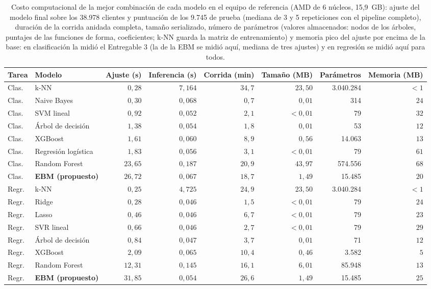 \begin{table}[tbp]
  \centering\scriptsize\setlength{\tabcolsep}{3pt}
  \caption{Costo computacional de la mejor combinación de cada modelo en el equipo de referencia (AMD de 6 núcleos, 15,9~GB): ajuste del modelo final sobre los 38.978 clientes y puntuación de los 9.745 de prueba (mediana de 3 y 5 repeticiones con el pipeline completo), duración de la corrida anidada completa, tamaño serializado, número de parámetros (valores almacenados: nodos de los árboles, puntajes de las funciones de forma, coeficientes; k-NN guarda la matriz de entrenamiento) y memoria pico del ajuste por encima de la base: en clasificación la midió el Entregable 3 (la de la EBM se midió aquí, mediana de tres ajustes) y en regresión se midió aquí para todos.}
  \label{tab:costo}
  \begin{tabular}{@{}l l r r r r r r@{}}
    \toprule
    Tarea & Modelo & Ajuste (s) & Inferencia (s) & Corrida (min) & Tamaño (MB) & Parámetros & Memoria (MB) \\
    \midrule
    Clas. & k-NN & $0{,}28$ & $7{,}164$ & $34{,}7$ & $23{,}50$ & 3.040.284 & $<1$ \\
    Clas. & Naive Bayes & $0{,}30$ & $0{,}068$ & $0{,}7$ & $0{,}01$ & 314 & $24$ \\
    Clas. & SVM lineal & $0{,}92$ & $0{,}052$ & $2{,}1$ & $<0{,}01$ & 79 & $32$ \\
    Clas. & Árbol de decisión & $1{,}38$ & $0{,}054$ & $1{,}8$ & $0{,}01$ & 53 & $12$ \\
    Clas. & XGBoost & $1{,}61$ & $0{,}060$ & $8{,}9$ & $0{,}56$ & 14.063 & $13$ \\
    Clas. & Regresión logística & $1{,}83$ & $0{,}056$ & $3{,}1$ & $<0{,}01$ & 79 & $61$ \\
    Clas. & Random Forest & $23{,}65$ & $0{,}187$ & $20{,}9$ & $43{,}97$ & 574.556 & $68$ \\
    Clas. & \textbf{EBM (propuesto)} & $26{,}72$ & $0{,}067$ & $18{,}7$ & $1{,}49$ & 15.485 & $20$ \\
    \midrule
    Regr. & k-NN & $0{,}25$ & $4{,}725$ & $24{,}9$ & $23{,}50$ & 3.040.284 & $<1$ \\
    Regr. & Ridge & $0{,}28$ & $0{,}046$ & $1{,}5$ & $<0{,}01$ & 79 & $24$ \\
    Regr. & Lasso & $0{,}46$ & $0{,}046$ & $6{,}7$ & $<0{,}01$ & 79 & $23$ \\
    Regr. & SVR lineal & $0{,}66$ & $0{,}046$ & $2{,}7$ & $<0{,}01$ & 79 & $29$ \\
    Regr. & Árbol de decisión & $0{,}84$ & $0{,}047$ & $3{,}7$ & $0{,}01$ & 71 & $12$ \\
    Regr. & XGBoost & $2{,}09$ & $0{,}065$ & $10{,}4$ & $0{,}46$ & 3.582 & $5$ \\
    Regr. & Random Forest & $12{,}31$ & $0{,}145$ & $16{,}1$ & $6{,}01$ & 85.948 & $13$ \\
    Regr. & \textbf{EBM (propuesto)} & $31{,}85$ & $0{,}054$ & $26{,}6$ & $1{,}49$ & 15.485 & $25$ \\
    \bottomrule
  \end{tabular}
\end{table}

